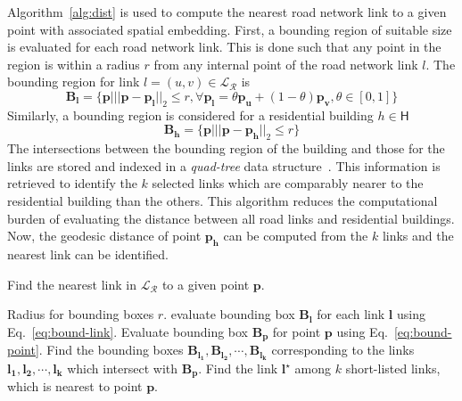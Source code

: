 \documentclass[sigconf]{acmart}
\begin{document}
Algorithm~\ref{alg:dist} is used to compute the nearest road network link to a given point with associated spatial embedding. First, a bounding region of suitable size is evaluated for each road network link. This is done such that any point in the region is within a radius $r$ from any internal point of the road network link $l$. The bounding region for link $l=(u,v)\in\mathcal{L_R}$ is
\begin{equation}
\mathbf{B_l}=\big\{\mathbf{p}\big|||\mathbf{p}-\mathbf{p_l}||_2\leq r,\forall \mathbf{p_l}=\theta\mathbf{p_u}+(1-\theta)\mathbf{p_v},\theta\in[0,1]\big\}\label{eq:bound-link}
\end{equation}
Similarly, a bounding region is considered for a residential building $h\in\mathsf{H}$
\begin{equation}
\mathbf{B_h}=\big\{\mathbf{p}\big|||\mathbf{p}-\mathbf{p_h}||_2\leq r\big\}\label{eq:bound-point}
\end{equation}
The intersections between the bounding region of the building and those for the links are stored and indexed in a \emph{quad-tree} data structure~\cite{quadtree1974}. This information is retrieved to identify the $k$ selected links which are comparably nearer to the residential building than the others. This algorithm reduces the computational burden of evaluating the distance between all road links and residential buildings. Now, the geodesic distance of point $\mathbf{p_h}$ can be computed from the $k$ links and the nearest link can be identified.
\begin{algorithm}
	\caption{Find the nearest link in $\mathcal{L_R}$ to a given point $\mathbf{p}$.}
	\label{alg:dist}
	\begin{algorithmic}[1]
		\REQUIRE Radius for bounding boxes $r$.
		\STATE evaluate bounding box $\mathbf{B_l}$ for each link $\mathbf{l}$ using Eq.~\ref{eq:bound-link}.
		\ENDFOR
		\STATE Evaluate bounding box $\mathbf{B_p}$ for point $\mathbf{p}$ using Eq.~\ref{eq:bound-point}.
		\STATE Find the bounding boxes $\mathbf{B_{l_1}},\mathbf{B_{l_2}},\cdots,\mathbf{B_{l_k}}$ corresponding to the links $\mathbf{l_1},\mathbf{l_2},\cdots,\mathbf{l_k}$ which intersect with $\mathbf{B_p}$.
		\STATE Find the link $\mathbf{l^\star}$ among $k$ short-listed links, which is nearest to point $\mathbf{p}$.
	\end{algorithmic}
\end{algorithm}
\end{document}
